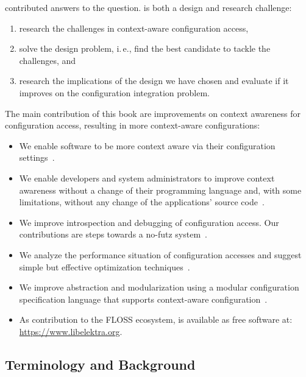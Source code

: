 \citet{raab2014program,raab2015global,raab2015safe,raab2015kps,raab2016improving,raab2016unanticipated,raab2016persistent,raab2016elektra,raab2017introducing,raab2017challenges} contributed answers to the question.
 is both a design and research challenge:

\begin{enumerate}
\item research the challenges in context-aware configuration access,
\item solve the design problem, i.\,e., find the best candidate to tackle the challenges, and
\item research the implications of the design we have chosen and evaluate if it improves on the configuration integration problem.
\end{enumerate}

The main contribution of this book are improvements on context awareness for configuration access, resulting in more context-aware configurations:
\begin{itemize}
\item We enable software to be more context aware via their configuration settings~\cite{raab2015kps}.
\item We enable developers and system administrators to improve context awareness without a change of their programming language and, with some limitations, without any change of the applications' source code~\cite{raab2016unanticipated}.
\item We improve introspection and debugging of configuration access. Our contributions are steps towards a no-futz system~\cite{holland2001nofutz}.
\item We analyze the performance situation of configuration accesses and suggest simple but effective optimization techniques~\cite{raab2014program}.
\item We improve abstraction and modularization using a modular configuration specification language that supports context-aware configuration~\cite{raab2016improving}.
\item As contribution to the FLOSS ecosystem, \elektra{} is available as free software at:
\url{https://www.libelektra.org}.
\end{itemize}



\subsection{Terminology and Background}

